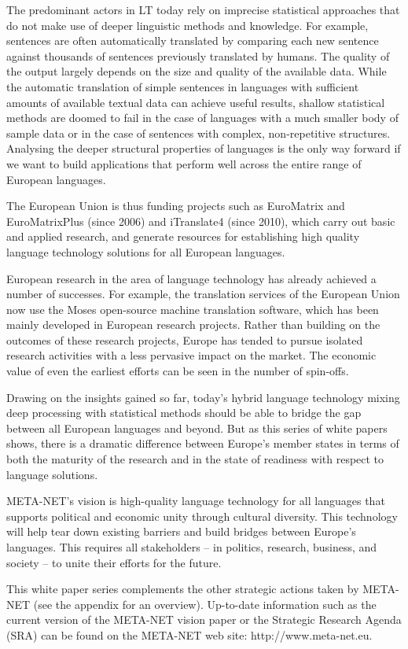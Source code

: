 \begin{multicols}{2}

The predominant actors in LT today rely on imprecise statistical approaches that do not make use of deeper linguistic methods and knowledge. For example, sentences are often automatically translated by comparing each new sentence against thousands of sentences previously translated by humans. The quality of the output largely depends on the size and quality of the available data. While the automatic translation of simple sentences in languages with sufficient amounts of available textual data can achieve useful results, shallow statistical methods are doomed to fail in the case of languages with a much smaller body of sample data or in the case of sentences with complex, non-repetitive structures. Analysing the deeper structural properties of languages is the only way forward if we want to build applications that perform well across the entire range of European languages.

The European Union is thus funding projects such as EuroMatrix and EuroMatrixPlus (since 2006) and iTranslate4 (since 2010), which carry out basic and applied research, and generate resources for establishing high quality language technology solutions for all European languages. 

European research in the area of language technology has already achieved a number of successes. For example, the translation services of the European Union now use the Moses open-source machine translation software, which has been mainly developed in European research projects. Rather than building on the outcomes of these research projects, Europe has tended to pursue isolated research activities with a less pervasive impact on the market. The economic value of even the earliest efforts can be seen in the number of spin-offs. 


Drawing on the insights gained so far, today’s hybrid language technology mixing deep processing with statistical methods should be able to bridge the gap between all European languages and beyond. But as this series of white papers shows, there is a dramatic difference between Europe's member states in terms of both the maturity of the research and in the state of readiness with respect to language solutions.  

META-NET’s vision is high-quality language technology for all languages that supports political and economic unity through cultural diversity. This technology will help tear down existing barriers and build bridges between Europe’s languages. This requires all stakeholders -- in politics, research, business, and society -- to unite their efforts for the future.

This white paper series complements the other strategic actions taken by META-NET (see the appendix for an overview). Up-to-date information such as the current version of the META-NET vision paper \cite{Meta1} or the Strategic Research Agenda (SRA) can be found on the META-NET web site: http://www.meta-net.eu.
\end{multicols}

